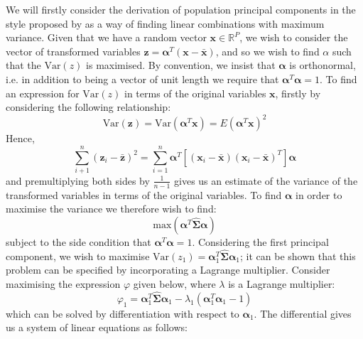 We will firstly consider the derivation of population principal components in the style proposed by \cite{Hotelling:1933} as a way of finding linear combinations with maximum variance.   Given that we have a random vector $\boldsymbol{x} \in \mathbb{R}^{P}$, we wish to consider the vector of transformed variables $\boldsymbol{z} = \boldsymbol{\alpha}^{T}(\boldsymbol{x} - \boldsymbol{\bar{x}})$, and so we wish to find $\alpha$ such that the $\mbox{Var}(z)$ is maximised.  By convention, we insist that $\boldsymbol{\alpha}$ is orthonormal, i.e. in addition to being a vector of unit length we require that $\boldsymbol{\alpha}^{T}\boldsymbol{\alpha} = 1$.   To find an expression for $\mbox{Var}(z)$ in terms of the original variables $\boldsymbol{x}$, firstly by considering the following relationship:
\begin{displaymath}
\mbox{Var}(\boldsymbol{z}) = \mbox{Var}(\boldsymbol{\alpha}^{T}\boldsymbol{x}) = E(\boldsymbol{\alpha}^{T}\boldsymbol{x})^{2}
\end{displaymath}
Hence,
\begin{displaymath}
\sum_{i+1}^{n}(\boldsymbol{z}_{i} - \boldsymbol{\bar{z}})^{2} = \sum_{i=1}^{n}\boldsymbol{\alpha}^{T}\left[(\boldsymbol{x}_{i} - \boldsymbol{\bar{x}})(\boldsymbol{x}_{i} - \boldsymbol{\bar{x}})^{T}\right] \boldsymbol{\alpha}
\end{displaymath}
and premultiplying both sides by $\frac{1}{n-1}$ gives us an estimate of the variance of the transformed variables in terms of the original variables.  To find $\boldsymbol{\alpha}$ in order to maximise the variance we therefore wish to find:  
\begin{equation}
\mbox{max}(\boldsymbol{\alpha}^{T}\boldsymbol{\hat{\Sigma}}\boldsymbol{\alpha})
\end{equation}
subject to the side condition that $\boldsymbol{\alpha}^{T}\boldsymbol{\alpha}= 1$.   Considering the first principal component, we wish to maximise $\mbox{Var}(z_{1}) = \boldsymbol{\alpha}_{1}^{T}\boldsymbol{\hat{\Sigma}}\boldsymbol{\alpha}_{1}$; it can be shown that this problem can be specified by incorporating a Lagrange multiplier.   Consider maximising the expression $\varphi$ given below, where $\lambda$ is a Lagrange multiplier:
\begin{equation}
\varphi_{1} = \boldsymbol{\alpha}_{1}^{T}\boldsymbol{\hat{\Sigma}}\boldsymbol{\alpha}_{1} - \lambda_{1}(\boldsymbol{\alpha}_{1}^{T}\boldsymbol{\alpha}_{1} - 1)
\end{equation}
which can be solved by differentiation with respect to $\boldsymbol{\alpha}_{1}$.   The differential gives us a system of linear equations as follows:
